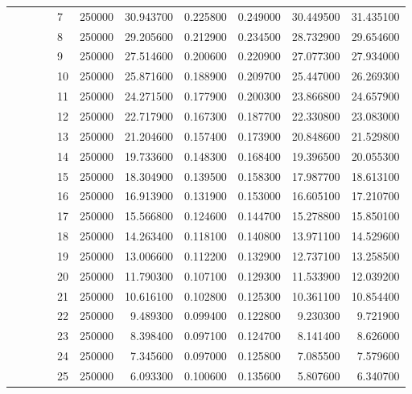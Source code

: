 \begin{tabular}{llllllrrrrr}
\cline{5-11}
 &  &  &  & 7 & 250000 & 30.943700 & 0.225800 & 0.249000 & 30.449500 & 31.435100 \\
\cline{5-11}
 &  &  &  & 8 & 250000 & 29.205600 & 0.212900 & 0.234500 & 28.732900 & 29.654600 \\
\cline{5-11}
 &  &  &  & 9 & 250000 & 27.514600 & 0.200600 & 0.220900 & 27.077300 & 27.934000 \\
\cline{5-11}
 &  &  &  & 10 & 250000 & 25.871600 & 0.188900 & 0.209700 & 25.447000 & 26.269300 \\
\cline{5-11}
 &  &  &  & 11 & 250000 & 24.271500 & 0.177900 & 0.200300 & 23.866800 & 24.657900 \\
\cline{5-11}
 &  &  &  & 12 & 250000 & 22.717900 & 0.167300 & 0.187700 & 22.330800 & 23.083000 \\
\cline{5-11}
 &  &  &  & 13 & 250000 & 21.204600 & 0.157400 & 0.173900 & 20.848600 & 21.529800 \\
\cline{5-11}
 &  &  &  & 14 & 250000 & 19.733600 & 0.148300 & 0.168400 & 19.396500 & 20.055300 \\
\cline{5-11}
 &  &  &  & 15 & 250000 & 18.304900 & 0.139500 & 0.158300 & 17.987700 & 18.613100 \\
\cline{5-11}
 &  &  &  & 16 & 250000 & 16.913900 & 0.131900 & 0.153000 & 16.605100 & 17.210700 \\
\cline{5-11}
 &  &  &  & 17 & 250000 & 15.566800 & 0.124600 & 0.144700 & 15.278800 & 15.850100 \\
\cline{5-11}
 &  &  &  & 18 & 250000 & 14.263400 & 0.118100 & 0.140800 & 13.971100 & 14.529600 \\
\cline{5-11}
 &  &  &  & 19 & 250000 & 13.006600 & 0.112200 & 0.132900 & 12.737100 & 13.258500 \\
\cline{5-11}
 &  &  &  & 20 & 250000 & 11.790300 & 0.107100 & 0.129300 & 11.533900 & 12.039200 \\
\cline{5-11}
 &  &  &  & 21 & 250000 & 10.616100 & 0.102800 & 0.125300 & 10.361100 & 10.854400 \\
\cline{5-11}
 &  &  &  & 22 & 250000 & 9.489300 & 0.099400 & 0.122800 & 9.230300 & 9.721900 \\
\cline{5-11}
 &  &  &  & 23 & 250000 & 8.398400 & 0.097100 & 0.124700 & 8.141400 & 8.626000 \\
\cline{5-11}
 &  &  &  & 24 & 250000 & 7.345600 & 0.097000 & 0.125800 & 7.085500 & 7.579600 \\
\cline{5-11}
 &  &  &  & 25 & 250000 & 6.093300 & 0.100600 & 0.135600 & 5.807600 & 6.340700 \\

\end{tabular}
